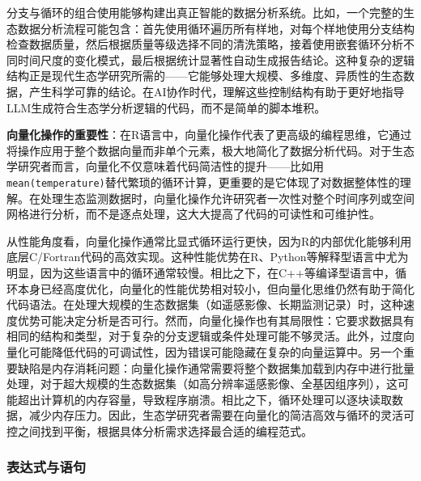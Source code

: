\documentclass[
]{book}
\begin{document}
分支与循环的组合使用能够构建出真正智能的数据分析系统。比如，一个完整的生态数据分析流程可能包含：首先使用循环遍历所有样地，对每个样地使用分支结构检查数据质量，然后根据质量等级选择不同的清洗策略，接着使用嵌套循环分析不同时间尺度的变化模式，最后根据统计显著性自动生成报告结论。这种复杂的逻辑结构正是现代生态学研究所需的------它能够处理大规模、多维度、异质性的生态数据，产生科学可靠的结论。在AI协作时代，理解这些控制结构有助于更好地指导LLM生成符合生态学分析逻辑的代码，而不是简单的脚本堆积。

\textbf{向量化操作的重要性}：在R语言中，向量化操作代表了更高级的编程思维，它通过将操作应用于整个数据向量而非单个元素，极大地简化了数据分析代码。对于生态学研究者而言，向量化不仅意味着代码简洁性的提升------比如用\texttt{mean(temperature)}替代繁琐的循环计算，更重要的是它体现了对数据整体性的理解。在处理生态监测数据时，向量化操作允许研究者一次性对整个时间序列或空间网格进行分析，而不是逐点处理，这大大提高了代码的可读性和可维护性。

从性能角度看，向量化操作通常比显式循环运行更快，因为R的内部优化能够利用底层C/Fortran代码的高效实现。这种性能优势在R、Python等解释型语言中尤为明显，因为这些语言中的循环通常较慢。相比之下，在C++等编译型语言中，循环本身已经高度优化，向量化的性能优势相对较小，但向量化思维仍然有助于简化代码语法。在处理大规模的生态数据集（如遥感影像、长期监测记录）时，这种速度优势可能决定分析是否可行。然而，向量化操作也有其局限性：它要求数据具有相同的结构和类型，对于复杂的分支逻辑或条件处理可能不够灵活。此外，过度向量化可能降低代码的可调试性，因为错误可能隐藏在复杂的向量运算中。另一个重要缺陷是内存消耗问题：向量化操作通常需要将整个数据集加载到内存中进行批量处理，对于超大规模的生态数据集（如高分辨率遥感影像、全基因组序列），这可能超出计算机的内存容量，导致程序崩溃。相比之下，循环处理可以逐块读取数据，减少内存压力。因此，生态学研究者需要在向量化的简洁高效与循环的灵活可控之间找到平衡，根据具体分析需求选择最合适的编程范式。

\hypertarget{ux8868ux8fbeux5f0fux4e0eux8bedux53e5}{%
\subsubsection{表达式与语句}\label{ux8868ux8fbeux5f0fux4e0eux8bedux53e5}}
\end{document}
